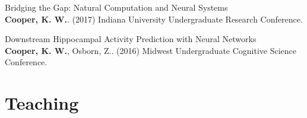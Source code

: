 \documentclass[10pt]{cooperCV2}
\begin{document}
\begin{etaremune}[itemindent=-1.5\bibhang, topsep=0pt,
				   itemsep=\bibsep,partopsep=0pt,parsep=0pt,leftmargin={\bibhang+\widthof{[999]}}]
	
    \item Bridging the Gap: Natural Computation and Neural Systems\\ \textbf{Cooper, K. W.}. (2017) Indiana University Undergraduate Research Conference. 
     
	
    \item Downstream Hippocampal Activity Prediction with Neural Networks\\ \textbf{Cooper, K. W.}, Osborn, Z.. (2016) Midwest Undergraduate Cognitive Science Conference. 
     
	


\end{etaremune}







%	






\section{Teaching}
\end{document}
